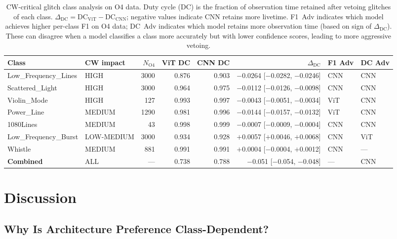 \documentclass[12pt]{article}
\begin{document}
\begin{table}
\centering
\caption{CW-critical glitch class analysis on O4 data. Duty cycle (DC) is the fraction of observation time retained after vetoing glitches of each class. $\Delta_\mathrm{DC} = \mathrm{DC}_\mathrm{ViT} - \mathrm{DC}_\mathrm{CNN}$; negative values indicate CNN retains more livetime. F1~Adv indicates which model achieves higher per-class F1 on O4 data; DC~Adv indicates which model retains more observation time (based on sign of $\Delta_\mathrm{DC}$). These can disagree when a model classifies a class more accurately but with lower confidence scores, leading to more aggressive vetoing.}
\label{tab:cw}
\begin{tabular}{llrrrrll}
\hline\hline
Class & CW impact & $N_\mathrm{O4}$ & ViT DC & CNN DC & $\Delta_\mathrm{DC}$ & F1 Adv & DC Adv \\
\hline
Low\_Frequency\_Lines & HIGH & 3000 & 0.876 & 0.903 & $-$0.0264 [$-$0.0282, $-$0.0246] & CNN & CNN \\
Scattered\_Light & HIGH & 3000 & 0.964 & 0.975 & $-$0.0112 [$-$0.0126, $-$0.0098] & CNN & CNN \\
Violin\_Mode & HIGH & 127 & 0.993 & 0.997 & $-$0.0043 [$-$0.0051, $-$0.0034] & ViT & CNN \\
Power\_Line & MEDIUM & 1290 & 0.981 & 0.996 & $-$0.0144 [$-$0.0157, $-$0.0132] & ViT & CNN \\
1080Lines & MEDIUM & 43 & 0.998 & 0.999 & $-$0.0007 [$-$0.0009, $-$0.0004] & CNN & CNN \\
Low\_Frequency\_Burst & LOW-MEDIUM & 3000 & 0.934 & 0.928 & $+$0.0057 [$+$0.0046, $+$0.0068] & CNN & ViT \\
Whistle & MEDIUM & 881 & 0.991 & 0.991 & $+$0.0004 [$-$0.0004, $+$0.0012] & CNN & --- \\
\hline
\textbf{Combined} & ALL & --- & 0.738 & 0.788 & $-$0.051 [$-$0.054, $-$0.048] & --- & CNN \\
\hline\hline
\end{tabular}
\end{table}


\section{Discussion}
\label{sec:discussion}

\subsection{Why Is Architecture Preference Class-Dependent?}
\end{document}
